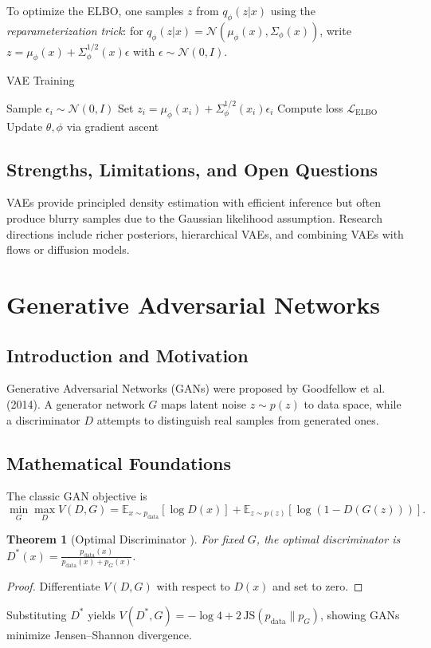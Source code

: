\documentclass[11pt]{book}
\newtheorem{theorem}{Theorem}[chapter]
\begin{document}
To optimize the ELBO, one samples $z$ from $q_\phi(z|x)$ using the \emph{reparameterization trick}: for $q_\phi(z|x)=\mathcal{N}(\mu_\phi(x),\Sigma_\phi(x))$, write $z=\mu_\phi(x)+\Sigma_\phi^{1/2}(x)\epsilon$ with $\epsilon\sim\mathcal{N}(0,I)$.

\begin{algorithm}
\caption{VAE Training}
\begin{algorithmic}[1]
    \STATE Sample $\epsilon_i\sim\mathcal{N}(0,I)$
    \STATE Set $z_i=\mu_\phi(x_i)+\Sigma_\phi^{1/2}(x_i)\epsilon_i$
    \STATE Compute loss $\mathcal{L}_{\text{ELBO}}$
    \STATE Update $\theta,\phi$ via gradient ascent
\ENDFOR
\end{algorithmic}
\end{algorithm}

\subsection{Strengths, Limitations, and Open Questions}
VAEs provide principled density estimation with efficient inference but often produce blurry samples due to the Gaussian likelihood assumption. Research directions include richer posteriors, hierarchical VAEs, and combining VAEs with flows or diffusion models.

\section{Generative Adversarial Networks}
\subsection{Introduction and Motivation}
Generative Adversarial Networks (GANs) were proposed by Goodfellow et al. (2014). A generator network $G$ maps latent noise $z\sim p(z)$ to data space, while a discriminator $D$ attempts to distinguish real samples from generated ones.

\subsection{Mathematical Foundations}
The classic GAN objective is
\begin{equation}
\min_G \max_D V(D,G) = \mathbb{E}_{x\sim p_{\text{data}}} [\log D(x)] + \mathbb{E}_{z\sim p(z)} [\log(1-D(G(z)))].
\end{equation}

\begin{theorem}[Optimal Discriminator \cite{goodfellow2014}]
For fixed $G$, the optimal discriminator is $D^*(x)=\frac{p_{\text{data}}(x)}{p_{\text{data}}(x)+p_G(x)}$.
\end{theorem}
\begin{proof}
Differentiate $V(D,G)$ with respect to $D(x)$ and set to zero.
\end{proof}
Substituting $D^*$ yields $V(D^*,G)= -\log 4 + 2\,\text{JS}(p_{\text{data}}\|p_G)$, showing GANs minimize Jensen--Shannon divergence.
\end{document}
